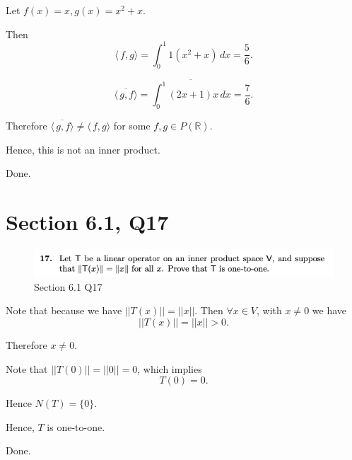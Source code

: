 \documentclass[12pt]{article}%
\begin{document}
Let $f(x)=x, g(x)=x^2+x.$

Then $$\langle\, f,g \rangle=\int_{0}^{1} 1(x^2+x) \,dx=\frac{5}{6}.$$

$$\overline{\langle\, g,f \rangle}=\overline{\int_{0}^{1} (2x+1)x \,dx}=\frac{7}{6}.$$

Therefore $\overline{\langle\, g,f \rangle} \neq \langle\, f,g \rangle$ for some $f,g \in P(\mathbb{R}).$

Hence, this is not an inner product.

Done.

\section{Section 6.1, Q17}
\begin{figure}[htp]
    \includegraphics[width = 15cm]{img/Q2.png}
    \caption{Section 6.1 Q17}
    \label{fig:figure1label}
\end{figure}

Note that because we have $||T(x)||=||x||.$ Then $\forall x\in V$, with $x\neq 0$ we have $$||T(x)||=||x||>0.$$

Therefore $x\neq 0.$ 

Note that $||T(0)||=||0||=0$, which implies $$T(0)=0.$$

Hence $N(T)=\{0\}.$

Hence, $T$ is one-to-one.

Done.
\end{document}
